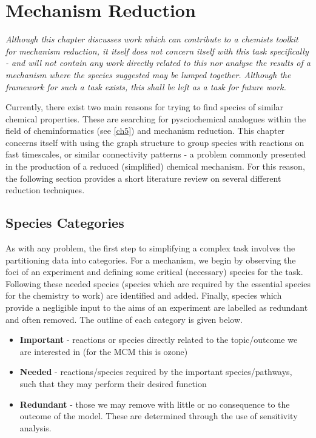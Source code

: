 \section{Mechanism Reduction}

\textit{Although this chapter discusses work which can contribute to a chemists toolkit for mechanism reduction, it itself does not concern itself with this task specifically - and will not contain any work directly related to this nor analyse the results of a mechanism where the species suggested may be lumped together. Although the framework for such a task exists, this shall be left as a task for future work.  }

Currently, there exist two main reasons for trying to find species of similar chemical properties. These are searching for pysciochemical analogues within the field of cheminformatics (see \autoref{ch5}) and mechanism reduction. This chapter concerns itself with using the graph structure to group species with reactions on fast timescales, or similar connectivity patterns - a problem commonly presented in the production of a reduced (simplified) chemical mechanism. For this reason, the following section provides a short literature review on several different reduction techniques.

\subsection{Species Categories}

As with any problem, the first step to simplifying a complex task involves the partitioning data into categories. For a mechanism, we begin by observing the foci of an experiment and defining some critical (necessary) species for the task. Following these needed species (species which are required by the essential species for the chemistry to work) are identified and added. Finally, species which provide a negligible input to the aims of an experiment are labelled as redundant and often removed.  The outline of each category is given below.


\begin{itemize}
    \item \textbf{Important} - reactions or species directly related to the topic/outcome we are interested in (for the MCM this is ozone)
    \item \textbf{Needed} - reactions/species required by the important species/pathways, such that they may perform their desired function
    \item \textbf{Redundant} - those we may remove with little or no consequence to the outcome of the model. These are determined through the use of sensitivity analysis.
\end{itemize}



